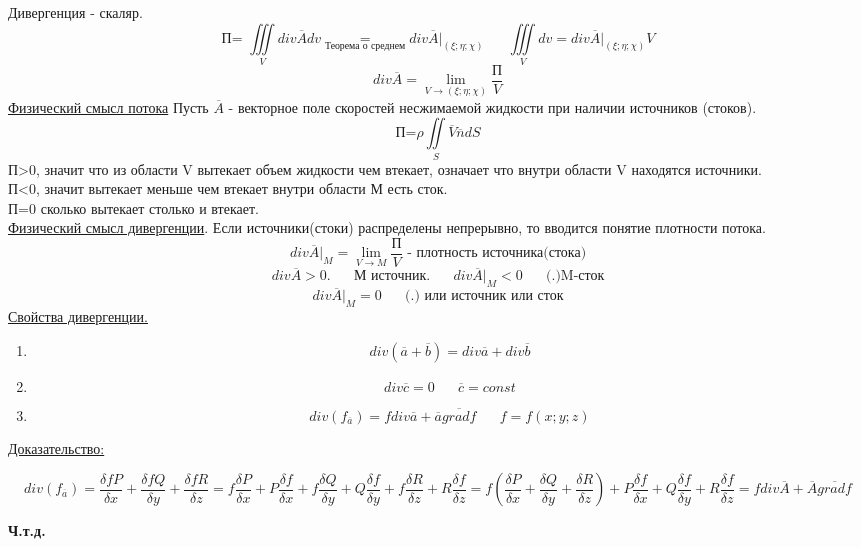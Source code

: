 \documentclass[12pt]{article}
\let\oldiint\iint
\let\oldiiint\iiint
\let\oldlim\lim
\renewcommand{\iint}{\oldiint\limits}
\renewcommand{\iiint}{\oldiiint\limits}
\renewcommand{\lim}{\oldlim\limits}
\begin{document}
  Дивергенция - скаляр.
  \[\text{П= }\iiint_V div \overline{A}dv\underset{\hyperref[th:8.12.1]{\text{Теорема о среднем}}}{=}
  div \overline{A}\Big|_{(\xi;\eta;\chi)} \hspace{20pt}\iiint_V dv=div \overline{A}\Big|_{(\xi;\eta;\chi)}V\]
  \[div \overline{A} = \lim_{V \to (\xi;\eta;\chi)}\frac{\text{П}}{V}\]
  \underline{Физический смысл потока}
  Пусть $\overline{A}$ - векторное поле скоростей несжимаемой жидкости при наличии источников (стоков).
  \[\text{П=}\rho\iint_S \overline{V}\overline{n}dS\]
  П>0, значит что из области V вытекает объем жидкости чем втекает, означает что внутри области V находятся источники.\\
  П<0, значит вытекает меньше чем втекает внутри области М есть сток.\\
  П=0  сколько вытекает столько и втекает.\\
  \underline{Физический смысл дивергенции}.
  Если источники(стоки) распределены непрерывно, то вводится понятие плотности потока.
  \[div \overline{A}\Big|_M=\lim_{V \to M}\frac{\text{П}}{V} \text{ - плотность источника(стока)}\]
  \[div \overline{A}>0.\hspace{20pt}\text{М источник.}\hspace{20pt} div \overline{A}\Big|_M<0 \hspace{20pt} \text{(.)M-сток}\]
  \[div \overline{A} \Big|_M=0 \hspace{20pt}\text{(.) или источник или сток}\]
  \underline{Свойства дивергенции.}
  \begin{enumerate}
    \item \[div(\overline{a}+\overline{b})=div \overline{a} + div \overline{b}\]
    \item \[div \overline{c}=0 \hspace{20pt} \overline{c} = const\]
    \item \[ div(f_{\overline{a}})=f div \overline{a}+\overline{a} \overline{grad f} \hspace{20pt} f=f(x;y;z)\]
  \end{enumerate}
  \underline{Доказательство:}
  \begin{adjustwidth}{1.5em}{1.5em}
    \[div(f_{\overline{a}})=
    \frac{\delta fP}{\delta x}+\frac{\delta f Q}{\delta y}+\frac{\delta f R}{\delta z}=
    f\frac{\delta P}{\delta x}+P\frac{\delta f}{\delta x}+
    f\frac{\delta Q}{\delta y}+Q\frac{\delta f}{\delta y}+
    f\frac{\delta R}{\delta z}+R\frac{\delta f}{\delta z}=
    f(\frac{\delta P}{\delta x}+\frac{\delta Q}{\delta y}+\frac{\delta R}{\delta z})+
    P\frac{\delta f}{\delta x}+Q\frac{\delta f}{\delta y}+R\frac{\delta f}{\delta z}=
    f div \overline{A} + \overline{A}\overline{gradf}\]
  \end{adjustwidth}
  \begin{center}
    \textbf{Ч.т.д.}
  \end{center}
\end{document}
